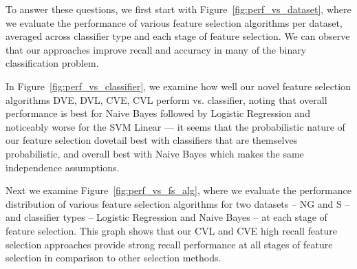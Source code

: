 To answer these questions, we first start with
Figure~\ref{fig:perf_vs_dataset}, where we evaluate the performance of
various feature selection algorithms per dataset, averaged across
classifier type and each stage of feature selection. We can observe that our approaches improve recall and accuracy in many of the binary classification problem.

In Figure~\ref{fig:perf_vs_classifier}, we examine how well our 
novel feature selection algorithms DVE, DVL, CVE, CVL 
perform vs. classifier, noting that overall performance is best
for Naive Bayes followed by Logistic Regression and noticeably worse for
the SVM Linear --- it seems that the probabilistic nature of our feature selection
dovetail best with classifiers that are themselves probabilistic,
and overall best with Naive Bayes which makes the same independence assumptions.

Next we examine Figure~\ref{fig:perf_vs_fs_alg}, where we evaluate the
performance distribution of various feature selection algorithms for
two datasets -- NG and S -- and classifier types -- Logistic
Regression and Naive Bayes -- at each stage of feature selection.
This graph shows that our CVL and CVE high recall feature selection
approaches provide strong recall performance at all stages of
feature selection in comparison to other selection methods.

